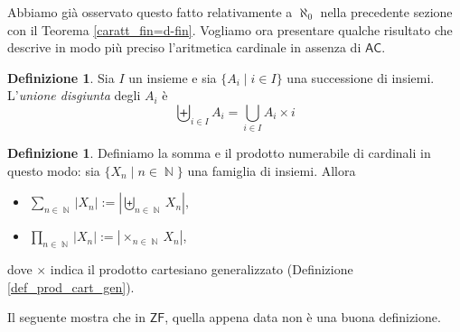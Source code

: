 \documentclass[12pt,a4paper]{report}
\theoremstyle{definition}
\newtheorem{defn}[teo]{Definizione}  %
\theoremstyle{num.custom-title}
\DeclareMathOperator{\N}{\mathbb{N}}
\newcommand{\AC}{\ensuremath{\mathsf{AC}}\xspace}
\newcommand{\ZF}{\ensuremath{\mathsf{ZF}}\xspace}
\begin{document}
Abbiamo già osservato questo fatto relativamente a $\aleph_0$ nella precedente sezione con il Teorema \ref{caratt_fin=d-fin}. Vogliamo ora presentare qualche risultato che descrive in modo più preciso l'aritmetica cardinale in assenza di \AC. 

\begin{defn}
Sia $I$ un insieme e sia $\{A_i \mid i \in I\}$ una successione di insiemi. L'\emph{unione disgiunta} degli $A_i$ è
\[
\biguplus_{i \in I} A_i = \bigcup_{i \in I} A_i \times {i}
\]
\end{defn}

\begin{defn}
Definiamo la somma e il prodotto numerabile di cardinali in questo modo: sia $\{X_n \mid n \in \N\}$ una famiglia di insiemi. Allora
\begin{itemize}
\item $\displaystyle\sum_{n \in \N} |X_n| := |\displaystyle\biguplus_{n \in \N} X_n |$,
\item $\displaystyle\prod_{n \in \N} |X_n| := |\!\times_{n \in \N} X_n |$,
\end{itemize}
dove $\times$ indica il prodotto cartesiano generalizzato (Definizione \ref{def_prod_cart_gen}).
\end{defn}

Il seguente mostra che in \ZF, quella appena data non è una buona definizione.
\end{document}
